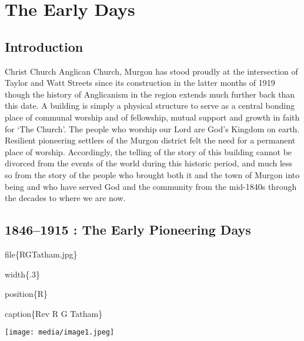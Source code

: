 \hypertarget{the-early-days}{%
\chapter{The Early Days}\label{the-early-days}}

\hypertarget{introduction}{%
\section{Introduction}\label{introduction}}

Christ Church Anglican Church, Murgon has stood proudly at the
intersection of Taylor and Watt Streets since its construction in the
latter months of 1919 though the history of Anglicanism in the region
extends much further back than this date. A building is simply a
physical structure to serve as a central bonding place of communal
worship and of fellowship, mutual support and growth in faith for `The
Church'. The people who worship our Lord are God's Kingdom on earth.
Resilient pioneering settlers of the Murgon district felt the need for a
permanent place of worship. Accordingly, the telling of the story of
this building cannot be divorced from the events of the world during
this historic period, and much less so from the story of the people who
brought both it and the town of Murgon into being and who have served
God and the community from the mid-1840s through the decades to where we
are now.

\hypertarget{the-early-pioneering-days}{%
\section{1846--1915 : The Early Pioneering
Days}\label{the-early-pioneering-days}}

file\{RGTatham.jpg\}

width\{.3\}

position\{R\}

caption\{Rev R G Tatham\}

\texttt{[image: media/image1.jpeg]}

